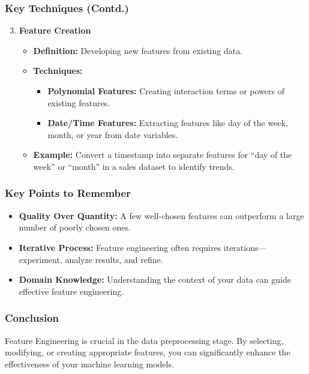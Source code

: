 \documentclass{beamer}
\begin{document}
\begin{frame}[fragile]
    \frametitle{Key Techniques (Contd.)}
    \begin{enumerate}
        \setcounter{enumi}{2} %
        \item \textbf{Feature Creation}
            \begin{itemize}
                \item \textbf{Definition:} Developing new features from existing data.
                \item \textbf{Techniques:}
                    \begin{itemize}
                        \item \textbf{Polynomial Features:} Creating interaction terms or powers of existing features.
                        \item \textbf{Date/Time Features:} Extracting features like day of the week, month, or year from date variables.
                    \end{itemize}
                \item \textbf{Example:} Convert a timestamp into separate features for “day of the week” or “month” in a sales dataset to identify trends.
            \end{itemize}
    \end{enumerate}
\end{frame}

\begin{frame}[fragile]
    \frametitle{Key Points to Remember}
    \begin{itemize}
        \item \textbf{Quality Over Quantity:} A few well-chosen features can outperform a large number of poorly chosen ones.
        \item \textbf{Iterative Process:} Feature engineering often requires iterations—experiment, analyze results, and refine.
        \item \textbf{Domain Knowledge:} Understanding the context of your data can guide effective feature engineering.
    \end{itemize}
\end{frame}

\begin{frame}[fragile]
    \frametitle{Conclusion}
    Feature Engineering is crucial in the data preprocessing stage. By selecting, modifying, or creating appropriate features, you can significantly enhance the effectiveness of your machine learning models.
\end{frame}
\end{document}

